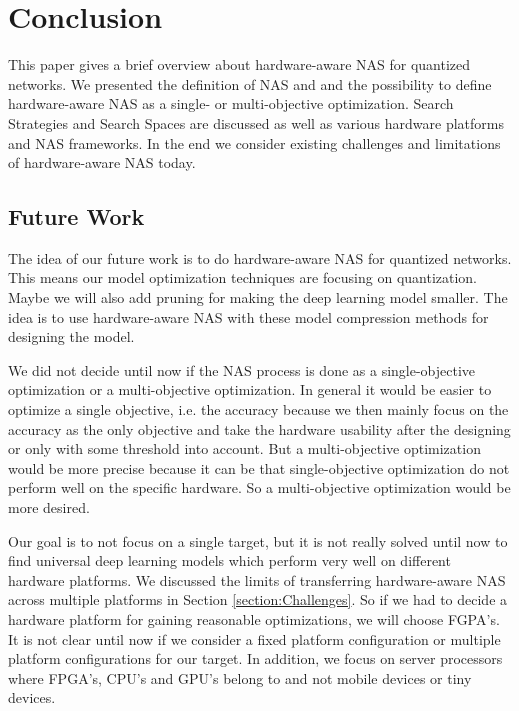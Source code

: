 \documentclass[conference]{IEEEtran}
\begin{document}
\section{Conclusion}

This paper gives a brief overview about hardware-aware NAS for quantized networks. We presented the definition of NAS and and the possibility to define hardware-aware NAS as a single- or multi-objective optimization. Search Strategies and Search Spaces are discussed as well as various hardware platforms and NAS frameworks. In the end we consider existing challenges and limitations of hardware-aware NAS today.

\subsection{Future Work}

The idea of our future work is to do hardware-aware NAS for quantized networks. This means our model optimization techniques are focusing on quantization. Maybe we will also add pruning for making the deep learning model smaller. The idea is to use hardware-aware NAS with these model compression methods for designing the model. 

We did not decide until now if the NAS process is done as a single-objective optimization or a multi-objective optimization. In general it would be easier to optimize a single objective, i.e. the accuracy because we then mainly focus on the accuracy as the only objective and take the hardware usability after the designing or only with some threshold into account. But a multi-objective optimization would be more precise because it can be that single-objective optimization do not perform well on the specific hardware. So a multi-objective optimization would be more desired.

Our goal is to not focus on a single target, but it is not really solved until now to find universal deep learning models which perform very well on different hardware platforms. We discussed the limits of transferring hardware-aware NAS across multiple platforms in Section \ref{section:Challenges}. So if we had to decide a hardware platform for gaining reasonable optimizations, we will choose FGPA's. It is not clear until now if we consider a fixed platform configuration or multiple platform configurations for our target. In addition, we focus on server processors where FPGA's, CPU's and GPU's belong to and not mobile devices or tiny devices. 
\end{document}
